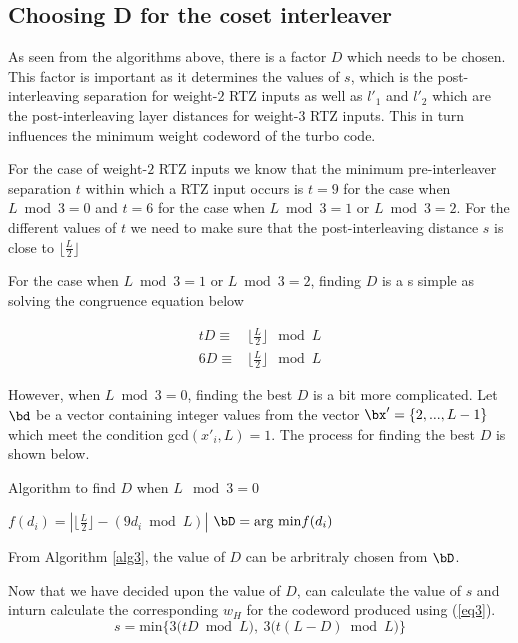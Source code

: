 \documentclass[11pt, oneside, dvipdfmx]{book}
\begin{document}
\subsection{Choosing D for the coset interleaver}
As seen from the algorithms above, there is a factor $D$ which needs to be chosen. This factor is important as it determines the values of $s$, which is the post-interleaving separation for weight-$2$ RTZ inputs as well as $l'_1$ and $l'_2$ which are the post-interleaving layer distances for weight-$3$ RTZ inputs. This in turn influences the minimum weight codeword of the turbo code.

For the case of weight-$2$ RTZ inputs we know that the minimum pre-interleaver separation $t$ within which a RTZ input occurs is $t=9$ for the case when $L \bmod 3 = 0$ and  $t=6$ for the case when $L \bmod 3 = 1$ or $L \bmod 3 = 2$. For the different values of $t$ we need to make sure that the post-interleaving distance $s$ is close to $\lfloor\frac{L}{2}\rfloor$

For the case when $L \bmod 3 = 1$ or $L \bmod 3 = 2$, finding $D$ is a s simple as solving the congruence equation below

\begin{equation}
\begin{split}
tD \equiv &\lfloor\frac{L}{2}\rfloor \mod L \\ 
6D\equiv&\lfloor\frac{L}{2}\rfloor \mod L
\end{split}
\label{eq5}
\end{equation}

However, when $L \bmod 3 = 0$, finding the best $D$ is a bit more complicated. Let $ \bd$ be a vector containing integer values from the vector $\bx'=\{2,...,L-1\}$ which meet the condition gcd$(x'_i,L)=1$.
The process for finding the best $D$ is shown below.

\begin{algorithm}
    \caption{Algorithm to find $D$ when $L \mod 3 =0$}
    \label{alg3}
\begin{algorithmic}
    \STATE $f(d_i) =|\lfloor\frac{L}{2}\rfloor - (9d_i \bmod L)|$
    \ENDFOR
     \STATE $\bD=\text{arg min} f(d_i)$
\end{algorithmic}
\end{algorithm}

From Algorithm \ref{alg3}, the value of $D$ can be arbritraly chosen from $\bD$. 

Now that we have decided upon the value of $D$, can calculate the value of $s$ and inturn calculate the corresponding $w_H$ for the codeword produced using (\ref{eq3}).
\begin{equation}
s= \text{min}\Big\{3\Big(tD \bmod L\Big),~3\Big(t(L-D) \bmod L\Big) \Big\}
\label{eq6}
\end{equation}
\end{document}
